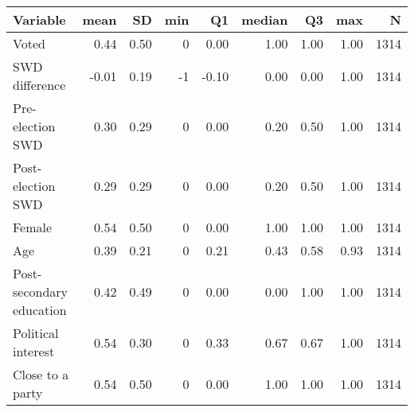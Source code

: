 
\begin{tabular}{l|r|r|r|r|r|r|r|r}
\hline
Variable & mean & SD & min & Q1 & median & Q3 & max & N\\
\hline
Voted & 0.44 & 0.50 & 0 & 0.00 & 1.00 & 1.00 & 1.00 & 1314\\
\hline
SWD difference & -0.01 & 0.19 & -1 & -0.10 & 0.00 & 0.00 & 1.00 & 1314\\
\hline
Pre-election SWD & 0.30 & 0.29 & 0 & 0.00 & 0.20 & 0.50 & 1.00 & 1314\\
\hline
Post-election SWD & 0.29 & 0.29 & 0 & 0.00 & 0.20 & 0.50 & 1.00 & 1314\\
\hline
Female & 0.54 & 0.50 & 0 & 0.00 & 1.00 & 1.00 & 1.00 & 1314\\
\hline
Age & 0.39 & 0.21 & 0 & 0.21 & 0.43 & 0.58 & 0.93 & 1314\\
\hline
Post-secondary education & 0.42 & 0.49 & 0 & 0.00 & 0.00 & 1.00 & 1.00 & 1314\\
\hline
Political interest & 0.54 & 0.30 & 0 & 0.33 & 0.67 & 0.67 & 1.00 & 1314\\
\hline
Close to a party & 0.54 & 0.50 & 0 & 0.00 & 1.00 & 1.00 & 1.00 & 1314\\
\hline
\end{tabular}
